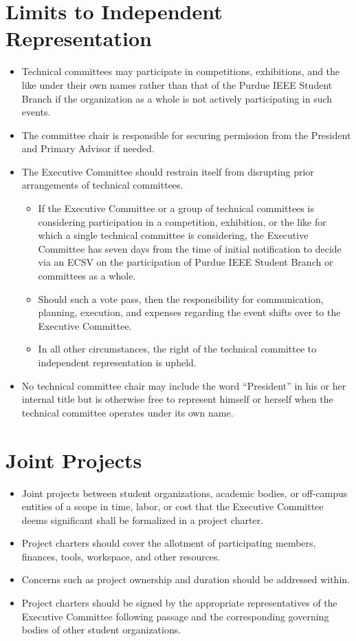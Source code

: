\documentclass[12pt]{constitution}
\begin{document}
\section{Limits to Independent Representation}
\label{sec:tech_limrepres}
\begin{itemize}
    \item Technical committees may participate in competitions, exhibitions, and the like under their own names rather than that of the Purdue IEEE Student Branch if the organization as a whole is not actively participating in such events.
    \item The committee chair is responsible for securing permission from the President and Primary Advisor if needed.
    \item The Executive Committee should restrain itself from disrupting prior arrangements of technical committees.
    \begin{itemize}
        \item If the Executive Committee or a group of technical committees is considering participation in a competition, exhibition, or the like for which a single technical committee is considering, the Executive Committee has seven days from the time of initial notification to decide via an ECSV on the participation of Purdue IEEE Student Branch or committees as a whole.
        \item Should such a vote pass, then the responsibility for communication, planning, execution, and expenses regarding the event shifts over to the Executive Committee.
        \item In all other circumstances, the right of the technical committee to independent representation is upheld.
    \end{itemize}
    \item No technical committee chair may include the word ``President'' in his or her internal title but is otherwise free to represent himself or herself when the technical committee operates under its own name.
\end{itemize}

\section{Joint Projects}
\label{sec:tech_joint}
\begin{itemize}
    \item Joint projects between student organizations, academic bodies, or off-campus entities of a scope in time, labor, or cost that the Executive Committee deems significant shall be formalized in a project charter.
    \item Project charters should cover the allotment of participating members, finances, tools, workspace, and other resources.
    \item Concerns such as project ownership and duration should be addressed within.
    \item Project charters should be signed by the appropriate representatives of the Executive Committee following passage and the corresponding governing bodies of other student organizations.
\end{itemize}
\end{document}
